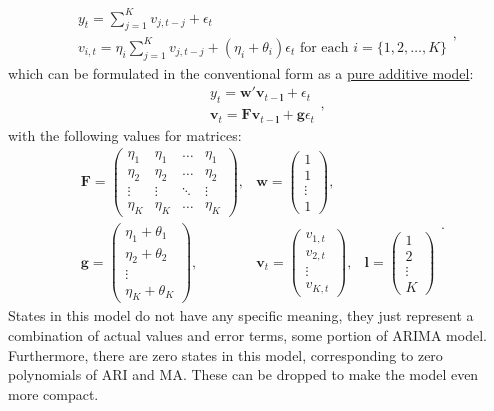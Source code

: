 \documentclass[
]{book}
\theoremstyle{definition}
\theoremstyle{definition}
\theoremstyle{definition}
\theoremstyle{definition}
\theoremstyle{remark}
\begin{document}
\begin{equation}
  \begin{aligned}
    &{y}_{t} = \sum_{j=1}^K v_{j,t-j} + \epsilon_t \\
    &v_{i,t} = \eta_i \sum_{j=1}^K v_{j,t-j} + (\eta_i + \theta_i) \epsilon_{t} \text{ for each } i=\{1, 2, \dots, K \}
  \end{aligned},
  \label{eq:ADAMARIMAExpanded}
\end{equation}
which can be formulated in the conventional form as a \protect\hyperlink{ADAMETSPureAdditive}{pure additive model}:
\begin{equation*}
  \begin{aligned}
    &{y}_{t} = \mathbf{w}' \mathbf{v}_{t-\boldsymbol{l}} + \epsilon_t \\
    &\mathbf{v}_{t} = \mathbf{F} \mathbf{v}_{t-\boldsymbol{l}} + \mathbf{g} \epsilon_t
  \end{aligned},
\end{equation*}
with the following values for matrices:
\begin{equation}
  \begin{aligned}
    \mathbf{F} = \begin{pmatrix} \eta_1 & \eta_1 & \dots & \eta_1 \\ \eta_2 & \eta_2 & \dots & \eta_2 \\ \vdots & \vdots & \ddots & \vdots \\ \eta_K & \eta_K & \dots & \eta_K \end{pmatrix}, & \mathbf{w} = \begin{pmatrix} 1 \\ 1 \\ \vdots \\ 1 \end{pmatrix}, \\
    \mathbf{g} = \begin{pmatrix} \eta_1 + \theta_1 \\ \eta_2 + \theta_2 \\ \vdots \\ \eta_K + \theta_K \end{pmatrix}, & \mathbf{v}_{t} = \begin{pmatrix} v_{1,t} \\ v_{2,t} \\ \vdots \\ v_{K,t} \end{pmatrix}, & \boldsymbol{l} = \begin{pmatrix} 1 \\ 2 \\ \vdots \\ K \end{pmatrix}
  \end{aligned}.
  \label{eq:ADAMARIMAMatrices}
\end{equation}
States in this model do not have any specific meaning, they just represent a combination of actual values and error terms, some portion of ARIMA model. Furthermore, there are zero states in this model, corresponding to zero polynomials of ARI and MA. These can be dropped to make the model even more compact.
\end{document}
